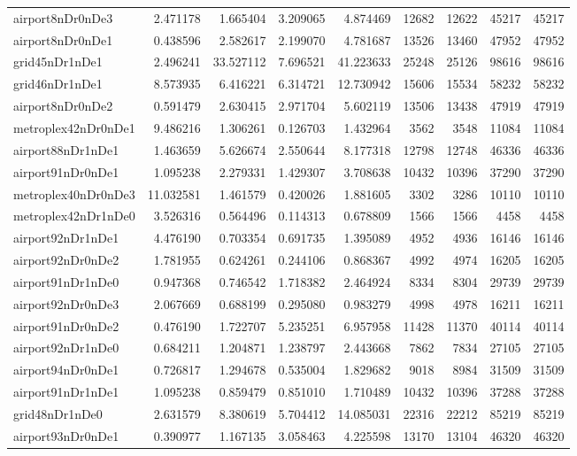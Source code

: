 \begin{longtable}{|l|r|r|r|r|r|r|r|r|}
airport8nDr0nDe3 & 2.471178 & 1.665404 & 3.209065 & 4.874469 & 12682 & 12622 & 45217 & 45217 \\
airport8nDr0nDe1 & 0.438596 & 2.582617 & 2.199070 & 4.781687 & 13526 & 13460 & 47952 & 47952 \\
grid45nDr1nDe1 & 2.496241 & 33.527112 & 7.696521 & 41.223633 & 25248 & 25126 & 98616 & 98616 \\
grid46nDr1nDe1 & 8.573935 & 6.416221 & 6.314721 & 12.730942 & 15606 & 15534 & 58232 & 58232 \\
airport8nDr0nDe2 & 0.591479 & 2.630415 & 2.971704 & 5.602119 & 13506 & 13438 & 47919 & 47919 \\
metroplex42nDr0nDe1 & 9.486216 & 1.306261 & 0.126703 & 1.432964 & 3562 & 3548 & 11084 & 11084 \\
airport88nDr1nDe1 & 1.463659 & 5.626674 & 2.550644 & 8.177318 & 12798 & 12748 & 46336 & 46336 \\
airport91nDr0nDe1 & 1.095238 & 2.279331 & 1.429307 & 3.708638 & 10432 & 10396 & 37290 & 37290 \\
metroplex40nDr0nDe3 & 11.032581 & 1.461579 & 0.420026 & 1.881605 & 3302 & 3286 & 10110 & 10110 \\
metroplex42nDr1nDe0 & 3.526316 & 0.564496 & 0.114313 & 0.678809 & 1566 & 1566 & 4458 & 4458 \\
airport92nDr1nDe1 & 4.476190 & 0.703354 & 0.691735 & 1.395089 & 4952 & 4936 & 16146 & 16146 \\
airport92nDr0nDe2 & 1.781955 & 0.624261 & 0.244106 & 0.868367 & 4992 & 4974 & 16205 & 16205 \\
airport91nDr1nDe0 & 0.947368 & 0.746542 & 1.718382 & 2.464924 & 8334 & 8304 & 29739 & 29739 \\
airport92nDr0nDe3 & 2.067669 & 0.688199 & 0.295080 & 0.983279 & 4998 & 4978 & 16211 & 16211 \\
airport91nDr0nDe2 & 0.476190 & 1.722707 & 5.235251 & 6.957958 & 11428 & 11370 & 40114 & 40114 \\
airport92nDr1nDe0 & 0.684211 & 1.204871 & 1.238797 & 2.443668 & 7862 & 7834 & 27105 & 27105 \\
airport94nDr0nDe1 & 0.726817 & 1.294678 & 0.535004 & 1.829682 & 9018 & 8984 & 31509 & 31509 \\
airport91nDr1nDe1 & 1.095238 & 0.859479 & 0.851010 & 1.710489 & 10432 & 10396 & 37288 & 37288 \\
grid48nDr1nDe0 & 2.631579 & 8.380619 & 5.704412 & 14.085031 & 22316 & 22212 & 85219 & 85219 \\
airport93nDr0nDe1 & 0.390977 & 1.167135 & 3.058463 & 4.225598 & 13170 & 13104 & 46320 & 46320 \\

\end{longtable}
